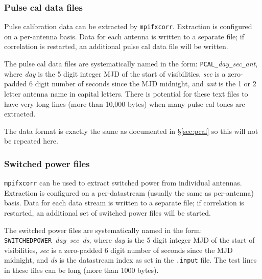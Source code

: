 \subsubsection{Pulse cal data files} \label{sec:difxpulsecal}

Pulse calibration data can be extracted by {\tt mpifxcorr}.
Extraction is configured on a per-antenna basis.
Data for each antenna is written to a separate file; if correlation is restarted, an additional pulse cal data file will be written.

The pulse cal data files are systematically named in the form: {\tt PCAL\_}{\em day}{\tt \_}{\em sec}{\tt \_}{\em ant}, where {\em day} is the 5 digit integer MJD of the start of visibilities, {\em sec} is a zero-padded 6 digit number of seconds since the MJD midnight, and {\em ant} is the 1 or 2 letter antenna name in capital letters.
There is potential for these text files to have very long lines (more than 10,000 bytes) when many pulse cal tones are extracted.

The data format is exactly the same as documented in \S\ref{sec:pcal} so this will not be repeated here.

\subsubsection{Switched power files} \label{sec:difxswitchedpower}

{\tt mpifxcorr} can be used to extract switched power from individual antennas.
Extraction is configured on a per-datastream (usually the same as per-antenna) basis.
Data for each data stream is written to a separate file; if correlation is restarted, an additional set of switched power files will be started.

The switched power files are systematically named in the form: {\tt SWITCHEDPOWER\_}{\em day}{\tt \_}{\em sec}{\tt \_}{\em ds}, where {\em day} is the 5 digit integer MJD of the start of visibilities, {\em sec} is a zero-padded 6 digit number of seconds since the MJD midnight, and {\em ds} is the datastream index as set in the {\tt .input} file.
The test lines in these files can be long (more than 1000 bytes).

